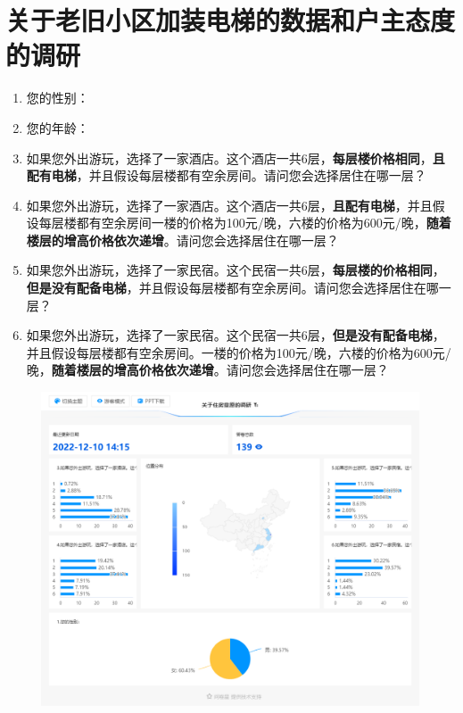 \documentclass[lang=cn,a4paper]{elegantpaper}
\begin{document}
    \section{关于老旧小区加装电梯的数据和户主态度的调研}
    \begin{enumerate}[1.]
        \item 您的性别：
        \item 您的年龄：
        \item 如果您外出游玩，选择了一家酒店。这个酒店一共6层，\textbf{每层楼价格相同}，\textbf{且配有电梯}，并且假设每层楼都有空余房间。请问您会选择居住在哪一层？
        \item 如果您外出游玩，选择了一家酒店。这个酒店一共6层，\textbf{且配有电梯}，并且假设每层楼都有空余房间一楼的价格为100元/晚，六楼的价格为600元/晚，\textbf{随着楼层的增高价格依次递增}。请问您会选择居住在哪一层？ 
        \item 如果您外出游玩，选择了一家民宿。这个民宿一共6层，\textbf{每层楼的价格相同}，\textbf{但是没有配备电梯}，并且假设每层楼都有空余房间。请问您会选择居住在哪一层？
        \item 如果您外出游玩，选择了一家民宿。这个民宿一共6层，\textbf{但是没有配备电梯}，并且假设每层楼都有空余房间。一楼的价格为100元/晚，六楼的价格为600元/晚，\textbf{随着楼层的增高价格依次递增}。请问您会选择居住在哪一层？
    \end{enumerate}
    \begin{figure}[H]
        \centering
        \includegraphics[scale=0.4]{questionnaire.png}
    \end{figure}
\end{document}
